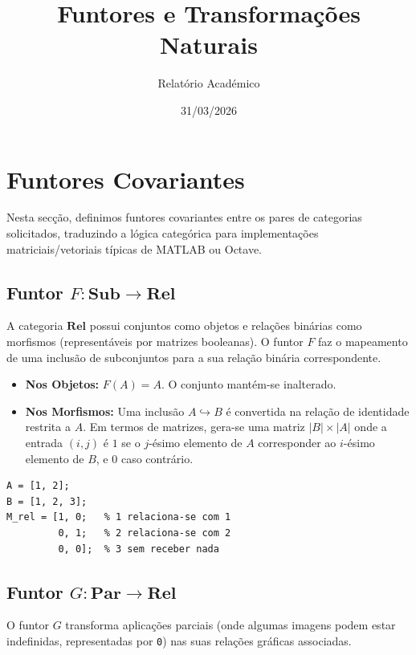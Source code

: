 \documentclass[11pt,a4paper]{article}
\title{\textbf{Funtores e Transformações Naturais}}
\author{Relatório Académico}
\date{31/03/2026}
\begin{document}
\maketitle

\section{Funtores Covariantes}

Nesta secção, definimos funtores covariantes entre os pares de categorias solicitados, traduzindo a lógica categórica para implementações matriciais/vetoriais típicas de MATLAB ou Octave.

\subsection{Funtor $F: \mathbf{Sub} \to \mathbf{Rel}$}

A categoria $\mathbf{Rel}$ possui conjuntos como objetos e relações binárias como morfismos (representáveis por matrizes booleanas). O funtor $F$ faz o mapeamento de uma inclusão de subconjuntos para a sua relação binária correspondente.

\begin{itemize}
    \item \textbf{Nos Objetos:} $F(A) = A$. O conjunto mantém-se inalterado.
    \item \textbf{Nos Morfismos:} Uma inclusão $A \hookrightarrow B$ é convertida na relação de identidade restrita a $A$. Em termos de matrizes, gera-se uma matriz $|B| \times |A|$ onde a entrada $(i, j)$ é $1$ se o $j$-ésimo elemento de $A$ corresponder ao $i$-ésimo elemento de $B$, e $0$ caso contrário.
\end{itemize}

\begin{lstlisting}[caption={Exemplo de Sub para Rel em MATLAB}]
A = [1, 2];
B = [1, 2, 3];
M_rel = [1, 0;   % 1 relaciona-se com 1
         0, 1;   % 2 relaciona-se com 2
         0, 0];  % 3 sem receber nada
\end{lstlisting}


\subsection{Funtor $G: \mathbf{Par} \to \mathbf{Rel}$}

O funtor $G$ transforma aplicações parciais (onde algumas imagens podem estar indefinidas, representadas por \texttt{0}) nas suas relações gráficas associadas.
\end{document}
